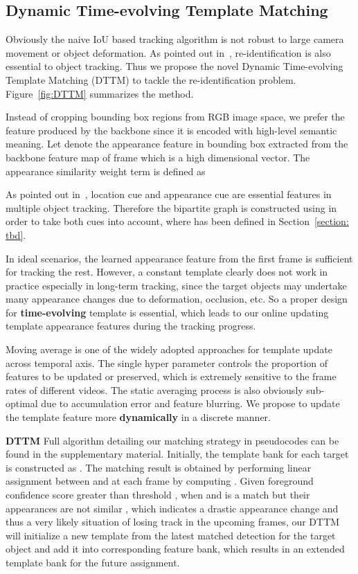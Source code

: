 \documentclass[10pt,twocolumn,letterpaper]{article}
\begin{document}
\subsection{Dynamic Time-evolving Template Matching}
Obviously the naive IoU based tracking algorithm is not robust to large camera movement or object deformation.
As pointed out in~\cite{bergmann2019tracking, luiten2018premvos}, re-identification is also essential to object tracking.
Thus we propose the novel Dynamic Time-evolving Template Matching (DTTM) to tackle the re-identification problem. Figure~\ref{fig:DTTM} summarizes the method.

Instead of cropping bounding box regions from RGB image space, we prefer the feature produced by the backbone since it is encoded with high-level semantic meaning. Let
 denote the appearance feature in bounding box  extracted from the backbone feature map of frame  which is a high dimensional vector. The appearance similarity weight term is defined as

As pointed out in~\cite{sadeghian2017tracking, xu2019spatial}, location cue and appearance cue are essential features in multiple object tracking.
Therefore the bipartite graph is constructed using  in order to take both cues into account, where  has been defined in Section~\ref{section: tbd}.

In ideal scenarios, the learned appearance feature from the first frame is sufficient for tracking the rest.
However, a constant template clearly does not work in practice especially in long-term tracking, since the target objects may undertake many appearance changes due to deformation, occlusion, etc.
So a proper design for \textbf{time-evolving} template is essential, which leads to our online updating template appearance features during the tracking progress.

Moving average is one of the widely adopted approaches for template update across temporal axis.
The single hyper parameter  controls the proportion of features to be updated or preserved,
which is extremely sensitive to the frame rates of different videos.
The static averaging process is also obviously sub-optimal due to accumulation error and feature blurring.
We propose to update the template feature more \textbf{dynamically} in a discrete manner.

\vspace{1mm}
{\bf DTTM}
 Full algorithm detailing our matching strategy in pseudocodes can be found in the supplementary material.
Initially, the template bank for each target  is constructed as .
The matching result is obtained by performing linear assignment between  and  at each frame  by computing .
Given foreground confidence score  greater than threshold , when  and  is a match but their appearances are not similar  , which indicates a drastic appearance change and thus a very likely situation of losing track in the upcoming frames,
our DTTM will initialize a new template from the latest matched detection  for the target object  and add it into corresponding feature bank, which results in an extended template bank for the future assignment.
\end{document}
